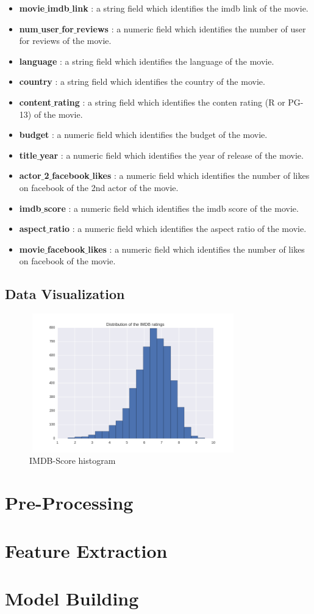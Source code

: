 \documentclass[conference]{IEEEtran}
\begin{document}
\begin{itemize}
	\item \textbf{movie$\_$imdb$\_$link} : a string field which identifies the imdb link of the movie. 
	\item \textbf{num$\_$user$\_$for$\_$reviews} : a numeric field which identifies the number of user for reviews of the movie. 
	\item \textbf{language}  : a string field which identifies the language of the movie.
	\item \textbf{country}  : a string field which identifies the country of the movie.
	\item \textbf{content$\_$rating} : a string field which identifies the conten rating (R or PG-13) of the movie.
	\item \textbf{budget} : a numeric field which identifies the budget of the movie.
	\item \textbf{title$\_$year} : a numeric field which identifies the year of release of the movie. 
	\item \textbf{actor$\_$2$\_$facebook$\_$likes} : a numeric field which identifies the number of likes on facebook of the 2nd actor of the movie.
	\item \textbf{imdb$\_$score} : a numeric field which identifies the imdb score of the movie.
	\item \textbf{aspect$\_$ratio}  : a numeric field which identifies the aspect ratio of the movie. 
	\item \textbf{movie$\_$facebook$\_$likes}  : a numeric field which identifies the number of likes on facebook of the movie.\\
\end{itemize}
\subsection{Data Visualization}
\begin{figure}[H]
  \centering	
  \captionsetup{justification=centering}
  \includegraphics[height=6cm, width=9cm, trim={0mm 0mm 0mm 0mm},clip]{../visualizations/IMDB-Score-Histogram}
  \caption{IMDB-Score histogram}
  \label{fig:fig1}
\end{figure}

\section{Pre-Processing}
\section{Feature Extraction}
\section{Model Building}
\newpage


\end{document}
